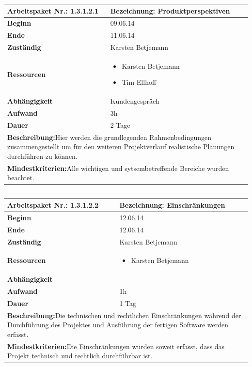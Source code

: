 \documentclass[fontsize=12pt,paper=a4,twoside]{scrartcl}
\begin{document}
\begin{tabular}{|p{5.3cm}|p{9.7cm}|}\hline
	\textbf{Arbeitspaket Nr.:} 1.3.1.2.1 & \textbf{Bezeichnung:} Produktperspektiven\\ \hline \hline
	\textbf{Beginn} & 09.06.14\\ \hline
	\textbf{Ende} & 11.06.14\\ \hline
	\textbf{Zuständig} & Karsten Betjemann\\ \hline
	\textbf{Ressourcen} & \begin{itemize}
		\item Karsten Betjemann
		\item Tim Ellhoff
	\end{itemize}    \\ \hline
	\textbf{Abhängigkeit} & Kundengespräch\\ \hline
	\textbf{Aufwand} & 3h\\ \hline
	\textbf{Dauer} & 2 Tage\\ \hline
	\multicolumn{2}{|p{15cm}|}{\textbf{Beschreibung:}\newline Hier werden die grundlegenden Rahmenbedingungen zusammengestellt um für den weiteren Projektverlauf realistische Planungen durchführen zu können. }\\ \hline
	\multicolumn{2}{|p{15cm}|}{\textbf{Mindestkriterien:}\newline Alle wichtigen und sytsembetreffende Bereiche wurden beachtet. }\\ \hline
\end{tabular}

\begin{verbatim} 
\end{verbatim}


\begin{tabular}{|p{5.3cm}|p{9.7cm}|}\hline
	\textbf{Arbeitspaket Nr.:} 1.3.1.2.2 & \textbf{Bezeichnung:} Einschränkungen\\ \hline \hline
	\textbf{Beginn} & 12.06.14\\ \hline
	\textbf{Ende} & 12.06.14\\ \hline
	\textbf{Zuständig} & Karsten Betjemann\\ \hline
	\textbf{Ressourcen} & \begin{itemize}
		\item Karsten Betjemann
	\end{itemize}    \\ \hline
	\textbf{Abhängigkeit} &\\ \hline
	\textbf{Aufwand} & 1h\\ \hline
	\textbf{Dauer} & 1 Tag\\ \hline
	\multicolumn{2}{|p{15cm}|}{\textbf{Beschreibung:}\newline Die technischen und rechtlichen Einschränkungen während der Durchführung des Projektes und Ausführung der 
		fertigen Software werden erfasst. }\\ \hline
	\multicolumn{2}{|p{15cm}|}{\textbf{Mindestkriterien:}\newline Die Einschränkungen wurden soweit erfasst, dass das Projekt technisch und rechtlich durchführbar ist. }\\ \hline
\end{tabular}
\end{document}
